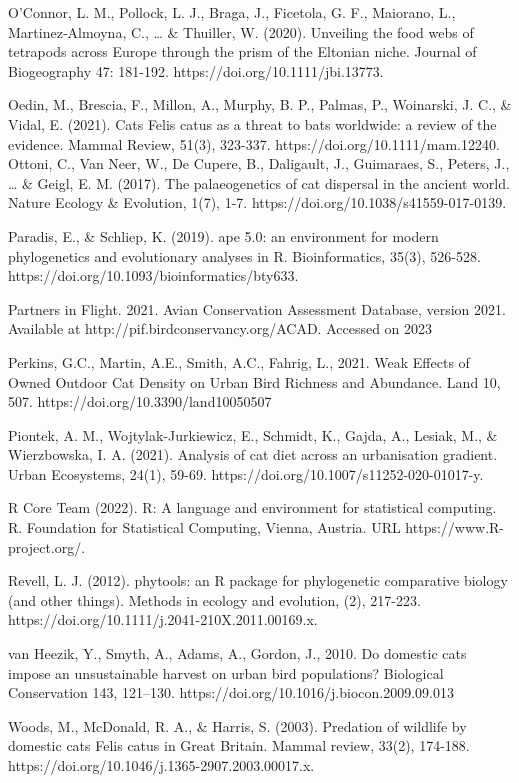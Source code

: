 \documentclass[
  super,
  review,
  3p]{elsarticle}
\begin{document}
O'Connor, L. M., Pollock, L. J., Braga, J., Ficetola, G. F., Maiorano,
L., Martinez‐Almoyna, C., \ldots{} \& Thuiller, W. (2020). Unveiling the
food webs of tetrapods across Europe through the prism of the Eltonian
niche. Journal of Biogeography 47: 181-192.
https://doi.org/10.1111/jbi.13773.

Oedin, M., Brescia, F., Millon, A., Murphy, B. P., Palmas, P.,
Woinarski, J. C., \& Vidal, E. (2021). Cats Felis catus as a threat to
bats worldwide: a review of the evidence. Mammal Review, 51(3), 323-337.
https://doi.org/10.1111/mam.12240. Ottoni, C., Van Neer, W., De Cupere,
B., Daligault, J., Guimaraes, S., Peters, J., \ldots{} \& Geigl, E. M.
(2017). The palaeogenetics of cat dispersal in the ancient world. Nature
Ecology \& Evolution, 1(7), 1-7.
https://doi.org/10.1038/s41559-017-0139.

Paradis, E., \& Schliep, K. (2019). ape 5.0: an environment for modern
phylogenetics and evolutionary analyses in R. Bioinformatics, 35(3),
526-528. https://doi.org/10.1093/bioinformatics/bty633.

Partners in Flight. 2021. Avian Conservation Assessment Database,
version 2021. Available at http://pif.birdconservancy.org/ACAD. Accessed
on 2023

Perkins, G.C., Martin, A.E., Smith, A.C., Fahrig, L., 2021. Weak Effects
of Owned Outdoor Cat Density on Urban Bird Richness and Abundance. Land
10, 507. https://doi.org/10.3390/land10050507

Piontek, A. M., Wojtylak-Jurkiewicz, E., Schmidt, K., Gajda, A., Lesiak,
M., \& Wierzbowska, I. A. (2021). Analysis of cat diet across an
urbanisation gradient. Urban Ecosystems, 24(1), 59-69.
https://doi.org/10.1007/s11252-020-01017-y.

R Core Team (2022). R: A language and environment for statistical
computing. R. Foundation for Statistical Computing, Vienna, Austria. URL
https://www.R-project.org/.

Revell, L. J. (2012). phytools: an R package for phylogenetic
comparative biology (and other things). Methods in ecology and
evolution, (2), 217-223.
https://doi.org/10.1111/j.2041-210X.2011.00169.x.

van Heezik, Y., Smyth, A., Adams, A., Gordon, J., 2010. Do domestic cats
impose an unsustainable harvest on urban bird populations? Biological
Conservation 143, 121--130. https://doi.org/10.1016/j.biocon.2009.09.013

Woods, M., McDonald, R. A., \& Harris, S. (2003). Predation of wildlife
by domestic cats Felis catus in Great Britain. Mammal review, 33(2),
174-188. https://doi.org/10.1046/j.1365-2907.2003.00017.x.
\end{document}
